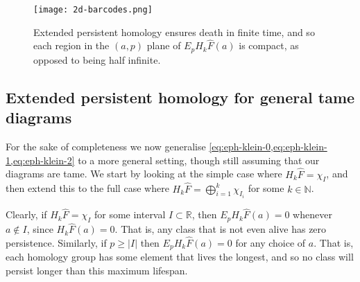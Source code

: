 \documentclass[12pt]{article}
\numberwithin{equation}{subsection}
\numberwithin{theorem}{subsection}
\numberwithin{lemma}{subsection}
\numberwithin{corollary}{subsection}
\numberwithin{definition}{subsection}
\numberwithin{example}{subsection}
\numberwithin{note}{subsection}
\newcommand{\rr}{\mathbb{R}}
\newcommand{\nn}{\mathbb{N}}
\begin{document}
            \begin{figure}[hpt]
                \centering
                \texttt{[image: 2d-barcodes.png]}
                \caption{Extended persistent homology ensures death in finite time, and so each region in the $(a,p)$ plane of $E_pH_k\widehat{F}(a)$ is compact, as opposed to being half infinite.}\label{fg:2d-barcodes}
            \end{figure}




        \subsection{Extended persistent homology for general tame diagrams} %
        \label{sub:extended_persistence_homology_for_general_tame_diagrams}

            For the sake of completeness we now generalise \cref{eq:eph-klein-0,eq:eph-klein-1,eq:eph-klein-2} to a more general setting, though still assuming that our diagrams are tame.
            We start by looking at the simple case where $H_k\widehat{F}=\chi_I$, and then extend this to the full case where \mbox{$H_k\widehat{F}=\bigoplus_{i=1}^k\chi_{I_i}$} for some $k\in\nn$.

            \bigskip

            Clearly, if $H_k\widehat{F}=\chi_I$ for some interval $I\subset\rr$, then $E_pH_k\widehat{F}(a)=0$ whenever $a\not\in I$, since $H_k\widehat{F}(a)=0$.
            That is, any class that is not even alive has zero persistence.
            Similarly, if $p\geqslant|I|$ then $E_pH_k\widehat{F}(a)=0$ for any choice of $a$.
            That is, each homology group has some element that lives the longest, and so no class will persist longer than this maximum lifespan.
\end{document}
